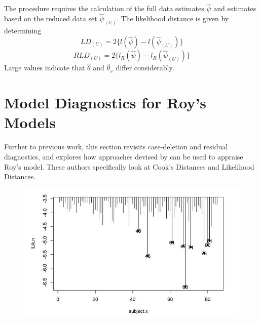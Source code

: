 \documentclass[12pt, a4paper]{report}
\theoremstyle{plain}
\theoremstyle{definition}
\theoremstyle{remark}
\begin{document}
	
	
	
	
	The
	procedure requires the calculation of the full data estimates
	$\hat{\psi}$ and estimates based on the reduced data set
	$\hat{\psi}_{(U)}$. The likelihood distance is given by
	determining
	\[
	LD_{(U)} = 2\{l(\hat{\psi}) - l( \hat{\psi}_{(U)}) \}\]\[
	RLD_{(U)} = 2\{l_{R}(\hat{\psi}) - l_{R}(\hat{\psi}_{(U)})\}
	\]
	Large values indicate that ${\hat{\theta}}$ and ${\hat{\theta}_\omega}$ differ considerably.
	

	
	

	\section{Model Diagnostics for Roy's Models}
	
	Further to previous work, this section revisits case-deletion and residual diagnostics, and explores how approaches devised by \citet{Galecki} can be used to appraise Roy's model. These authors specifically look at Cook's Distances and Likelihood Distances.
	
	
	
	
	
	\begin{figure}[h!]
		\centering
		\includegraphics[width=0.7\linewidth]{images/LogLik-JS-Roy}
		\caption{}
		\label{fig:LogLik-JS-Roy}
	\end{figure}
	
\end{document}
